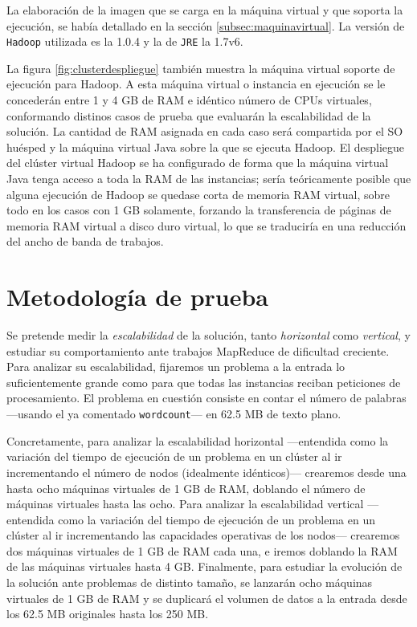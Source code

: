 La elaboraci\'on de la imagen que se carga en la m\'aquina virtual y que soporta la ejecuci\'on, se hab\'ia detallado en la secci\'on \ref{subsec:maquinavirtual}. La versi\'on de \texttt{Hadoop} utilizada es la 1.0.4 y la de \texttt{JRE} la 1.7v6. \newline

La figura \ref{fig:clusterdespliegue} tambi\'en muestra la m\'aquina virtual soporte de ejecuci\'on para Hadoop. A esta m\'aquina virtual o instancia en ejecuci\'on se le conceder\'an entre 1 y 4 GB de RAM e id\'entico n\'umero de CPUs virtuales, conformando distinos casos de prueba que evaluar\'an la escalabilidad de la soluci\'on. La cantidad de RAM asignada en cada caso ser\'a compartida por el SO hu\'esped y la m\'aquina virtual Java sobre la que se ejecuta Hadoop. El des\-plie\-gue del cl\'uster virtual Hadoop se ha configurado de forma que la m\'aquina virtual Java tenga acceso a toda la RAM de las instancias; ser\'ia te\'oricamente posible que alguna ejecuci\'on de Hadoop se quedase corta de memoria RAM virtual, sobre todo en los casos con 1 GB solamente, forzando la transferencia de p\'aginas de memoria RAM virtual a disco duro virtual, lo que se traducir\'ia en una reducci\'on del ancho de banda de trabajos.

\section{Metodolog\'ia de prueba}\label{sec:metodologiaprueba}
\noindent Se pretende medir la \emph{escalabilidad} de la soluci\'on, tanto \emph{horizontal} como \emph{vertical}, y estudiar su comportamiento ante trabajos MapReduce de dificultad creciente. Para analizar su escalabilidad, fijaremos un problema a la entrada lo suficientemente grande como para que todas las instancias reciban peticiones de procesamiento. El problema en cuesti\'on consiste en contar el n\'umero de palabras ---usando el ya comentado \texttt{wordcount}--- en 62.5 MB de texto plano. \newline 

Concretamente, para analizar la escalabilidad horizontal ---entendida como la variaci\'on del tiempo de ejecuci\'on de un problema en un cl\'uster al ir incrementando el n\'umero de nodos (idealmente id\'enticos)--- crearemos desde una hasta ocho m\'aquinas virtuales de 1 GB de RAM, doblando el n\'umero de m\'aquinas virtuales hasta las ocho. Para analizar la escalabilidad vertical ---entendida como la variaci\'on del tiempo de ejecuci\'on de un problema en un cl\'uster al ir incrementando las capacidades operativas de los nodos--- crearemos dos m\'aquinas virtuales de 1 GB de RAM cada una, e iremos doblando la RAM de las m\'aquinas virtuales hasta 4 GB. Finalmente, para estudiar la evoluci\'on de la soluci\'on ante problemas de distinto tama\~no, se lanzar\'an ocho m\'aquinas virtuales de 1 GB de RAM y se duplicar\'a el volumen de datos a la entrada desde los 62.5 MB originales hasta los 250 MB.\newline

